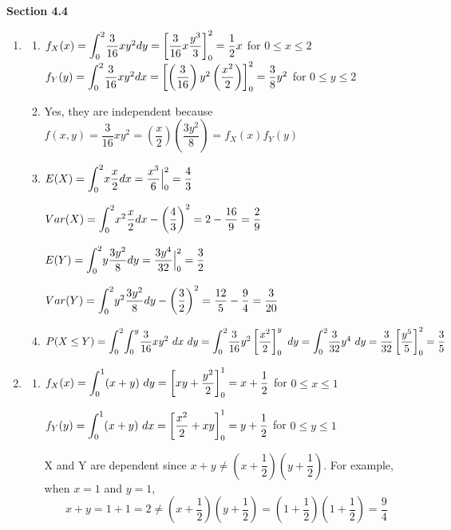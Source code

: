 \documentclass{article}
\newcommand\mfrac[2]{\left(\dfrac{#1}{#2}\right)}
\newcommand\lint{\mathlarger{\int}}
\begin{document}
    \textbf{Section 4.4}
    \begin{enumerate}
     \item 
      \begin{enumerate}
       \item 
	$f_X(x) = \lint_0^2 {\dfrac{3}{16}xy^2 dy} 
	  = \left[\dfrac{3}{16}x \dfrac{y^3}{3}\right]_0^2 = \dfrac{1}{2}x$ for $0 \le x \le 2$ \\
	  
	$f_Y(y) = \lint_0^2 {\dfrac{3}{16}xy^2 dx}
	  = \left[\mfrac{3}{16}y^2\mfrac{x^2}{2}\right]_0^2 = \dfrac{3}{8}y^2$ for $0 \le y \le 2$
       
       \item
	Yes, they are independent because $f(x,y) = \dfrac{3}{16}xy^2 = \mfrac{x}{2}\mfrac{3y^2}{8}
	  = f_X(x)f_Y(y)$
       
       \item
	$E(X) = \lint_0^2 {x \dfrac{x}{2} dx} = \dfrac{x^3}{6} \Big|_0^2 = \dfrac{4}{3}$
	
	$Var(X) = \lint_0^2 {x^2 \dfrac{x}{2} dx} - \mfrac{4}{3}^2 = 2 - \dfrac{16}{9}
	  = \dfrac{2}{9}$
	  
	$E(Y) = \lint_0^2 {y \dfrac{3y^2}{8} dy} = \dfrac{3y^4}{32} \Big|_0^2 = \dfrac{3}{2}$
	
	$Var(Y) = \lint_0^2 {y^2 \dfrac{3y^2}{8} dy} - \mfrac{3}{2}^2 = \dfrac{12}{5} - \dfrac{9}{4}
	  = \dfrac{3}{20}$
       
       \item
	$P(X \le Y) = \lint_0^2 \lint_0^y {\dfrac{3}{16}xy^2\ dx\ dy} 
	  = \lint_0^2 {\dfrac{3}{16}y^2 \left[\dfrac{x^2}{2}\right]_0^y\ dy}
	  = \lint_0^2 {\dfrac{3}{32}y^4\ dy} = \dfrac{3}{32}\left[\dfrac{y^5}{5}\right]_0^2
	  = \dfrac{3}{5}$
      \end{enumerate}
     
     \item
      \begin{enumerate}
       \item 
	$f_X(x) = \lint_0^1 {(x+y)\ dy} = \left[xy + \dfrac{y^2}{2}\right]_0^1 = x + \dfrac{1}{2}$ for $0\le x \le 1$
	
	$f_Y(y) = \lint_0^1 {(x+y)\ dx} = \left[\dfrac{x^2}{2} + xy\right]_0^1 = y + \dfrac{1}{2}$ for $0\le y \le 1$
	
	X and Y are dependent since $x+y \ne \left(x+\dfrac{1}{2}\right)\left(y+\dfrac{1}{2}\right)$. 
	For example, when $x=1$ and $y=1$, 
	$$x+y = 1+1 = 2 \ne \left(x+\dfrac{1}{2}\right)\left(y+\dfrac{1}{2}\right) = 
	  \left(1+\dfrac{1}{2}\right)\left(1+\dfrac{1}{2}\right) = \dfrac{9}{4}$$
       

\end{enumerate}
\end{enumerate}
\end{document}
